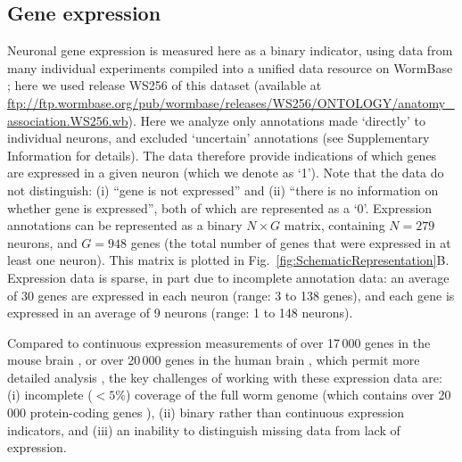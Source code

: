 \documentclass[10pt,letterpaper]{article}
\begin{document}
\subsection*{Gene expression}
Neuronal gene expression is measured here as a binary indicator, using data from many individual experiments compiled into a unified data resource on WormBase \cite{Harris:2009kd}; here we used release WS256 of this dataset (available at \url{ftp://ftp.wormbase.org/pub/wormbase/releases/WS256/ONTOLOGY/anatomy_association.WS256.wb}).
Here we analyze only annotations made `directly' to individual neurons, and excluded `uncertain' annotations (see Supplementary Information for details).
The data therefore provide indications of which genes are expressed in a given neuron (which we denote as `1').
Note that the data do not distinguish: (i) ``gene is not expressed'' and (ii) ``there is no information on whether gene is expressed'', both of which are represented as a `0'.
Expression annotations can be represented as a binary $N \times G$ matrix, containing $N=279$ neurons, and $G = 948$ genes (the total number of genes that were expressed in at least one neuron).
This matrix is plotted in Fig.~\ref{fig:SchematicRepresentation}B.
Expression data is sparse, in part due to incomplete annotation data: an average of 30 genes are expressed in each neuron (range: 3 to 138 genes), and each gene is expressed in an average of 9 neurons (range: 1 to 148 neurons).

Compared to continuous expression measurements of over 17\,000 genes in the mouse brain \cite{Lein:2007jn}, or over 20\,000 genes in the human brain \cite{Hawrylycz:2012ky}, which permit more detailed analysis \cite{Fulcher:2016ck, Ji:2014jw, Fakhry:2015kl, French2011, Vertes2016a, Parkes:2017dn}, the key challenges of working with these expression data are:
(i) incomplete ($<5$\%) coverage of the full worm genome (which contains over 20\,000 protein-coding genes \cite{Harris:2009kd}),
(ii) binary rather than continuous expression indicators, and
(iii) an inability to distinguish missing data from lack of expression.

\end{document}
